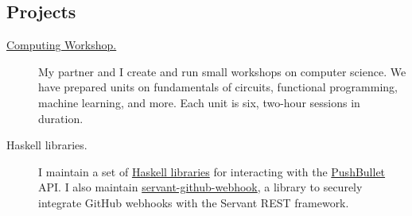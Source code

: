 \documentclass{article}
\begin{document}
\subsection*{Projects}

\begin{description}
  \item[\href{https://computing-workshop.com/}{Computing Workshop.}]
    My partner and I create and run small workshops on computer science.
    We have prepared units on fundamentals of circuits, functional
    programming, machine learning, and more. Each unit is six, two-hour
    sessions in duration.

  \item[Haskell libraries.]
    I maintain a set of
    \href{https://github.com/tsani/pushbullet-hs}{Haskell libraries} for
    interacting with the \href{https://pushbullet.com}{PushBullet} API.
    I also maintain
    \href{https://github.com/tsani/servant-github-webhook}{servant-github-webhook},
    a library to securely integrate GitHub webhooks with the Servant REST
    framework.

\end{description}
\end{document}
